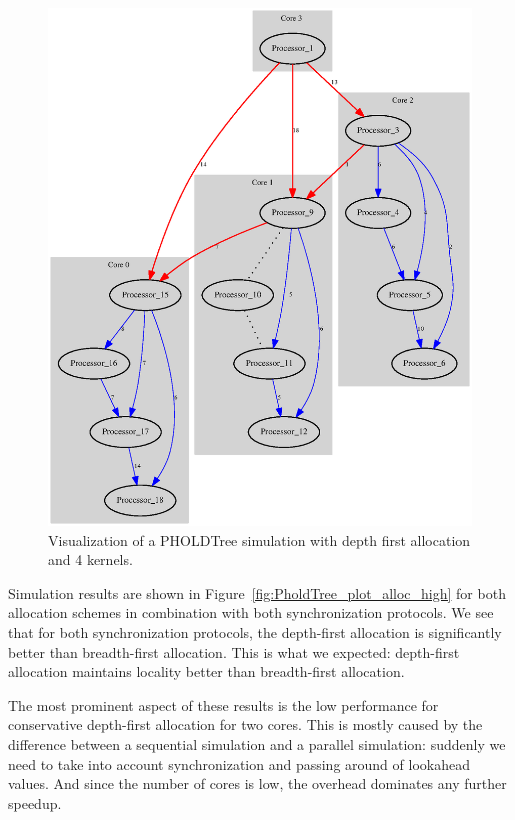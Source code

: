 \begin{figure}
    \center
    \includegraphics[width=\columnwidth]{fig/pholdtreed1n3t5000c4DFS.eps}
    \caption{Visualization of a PHOLDTree simulation with depth first allocation and 4 kernels.}
    \label{fig:pholdtree_visualize_parDFS}
\end{figure}

Simulation results are shown in Figure~\ref{fig:PholdTree_plot_alloc_high} for both allocation schemes in combination with both synchronization protocols.
We see that for both synchronization protocols, the depth-first allocation is significantly better than breadth-first allocation.
This is what we expected: depth-first allocation maintains locality better than breadth-first allocation.

The most prominent aspect of these results is the low performance for conservative depth-first allocation for two cores.
This is mostly caused by the difference between a sequential simulation and a parallel simulation: suddenly we need to take into account synchronization and passing around of lookahead values.
And since the number of cores is low, the overhead dominates any further speedup.

